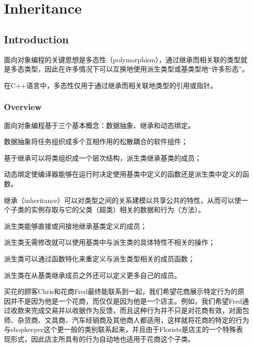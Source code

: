 \part{Inheritance}



\chapter{Introduction}

面向对象编程的关键思想是多态性（polymorphism），通过继承而相关联的类型就是多态类型，因此在许多情况下可以互换地使用派生类型或基类型地“许多形态”。

在C++语言中，多态性仅用于通过继承而相关联地类型的引用或指针。

\section{Overview}


面向对象编程基于三个基本概念：数据抽象、继承和动态绑定。

\begin{compactitem}
\item 数据抽象将任务组织成多个互相作用的松散耦合的软件组件；
\item 基于继承可以将类组织成一个层次结构，派生类继承基类的成员；
\item 动态绑定使编译器能够在运行时决定使用基类中定义的函数还是派生类中定义的函数。
\end{compactitem}


继承（inheritance）可以对类型之间的关系建模以共享公共的特性，从而可以使一个子类的实例存取与它的父类（超类）相关的数据和行为（方法）。

\begin{compactitem}
\item 派生类能够直接或间接地继承基类定义的成员；
\item 派生类无需修改就可以使用基类中与派生类的具体特性不相关的操作；
\item 派生类可以通过函数特化来重定义与派生类型相关的成员函数；
\item 派生类在从基类继承成员之外还可以定义更多自己的成员。
\end{compactitem}

买花的顾客Chris和花商Fred最终能联系到一起，我们希望花商展示特定行为的原因并不是因为他是一个花商，而仅仅是因为他是一个店主。例如，我们希望Fred通过收款来完成交易并以收据作为反馈，而且这种行为并不只是对花商有效，对面包师、杂货商、文具商、汽车经销商及其他商人都适用，这样就将花商的特定的行为与shopkeeper这个更一般的类别联系起来，并且由于Florists是店主的一个特殊表现形式，因此店主所具有的行为自动地也适用于花商这个子类。

